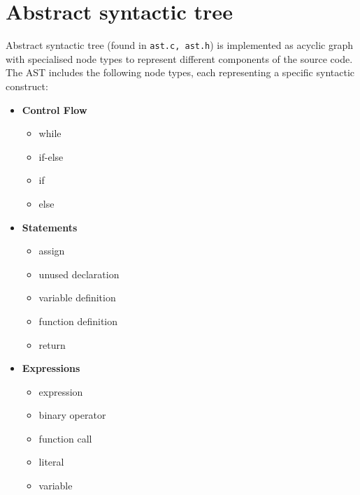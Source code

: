 \documentclass[a4paper, 11pt]{article}
\begin{document}
\section{Abstract syntactic tree}\label{sec:AST}
Abstract syntactic tree (found in \verb|ast.c, ast.h|) is implemented as acyclic graph with specialised node types to represent
different components of the source code.
The AST includes the following node types, each representing a specific syntactic construct: 
\newline
\noindent
\begin{minipage}[t]{0.3\textwidth}
\begin{itemize}
    \item \textbf{Control Flow}
    \begin{itemize}
        \itemsep-0.1em
        \item while
        \item if-else
        \item if
        \item else
    \end{itemize}
\end{itemize}
\end{minipage}%
\begin{minipage}[t]{0.3\textwidth}
\begin{itemize}
    \item \textbf{Statements}
    \begin{itemize}
        \itemsep-0.1em
        \item assign
        \item unused declaration
        \item variable definition
        \item function definition
        \item return
    \end{itemize}
\end{itemize}
\end{minipage}
\begin{minipage}[t]{0.3\textwidth}
\begin{itemize}
    \item \textbf{Expressions}
    \begin{itemize}
        \itemsep-0.1em
        \item expression
        \item binary operator
        \item function call
        \item literal
        \item variable
    \end{itemize}
\end{itemize}
\end{minipage}
\end{document}
